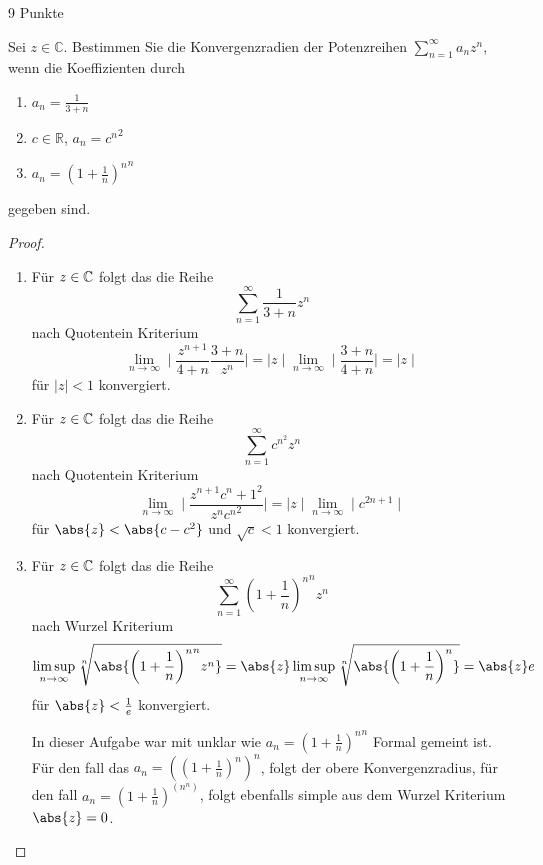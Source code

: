\documentclass{problemset}
\begin{document}
\begin{problem}[Konvergenzradien]{9 Punkte}

Sei $z \in \mathbb{C}$. Bestimmen Sie die Konvergenzradien der Potenzreihen
$\sum\limits_{n=1}^{\infty} a_n z^n$, wenn die Koeffizienten durch
\begin{enumerate}
    \item $a_n = \frac{1}{3 + n}$
    \item $c \in \mathbb{R}$, $a_n = {c^n}^2$
    \item $a_n = {\left(1 + \frac{1}{n}\right)^n}^n$
\end{enumerate}
gegeben sind.

\begin{proof}
    \leavevmode
    \begin{enumerate}
        \item Für \(z \in \mathbb{C}\) folgt das die Reihe
              \[
                  \sum_{n=1}^{\infty} \frac{1}{3 + n} z^n
              \] nach Quotentein Kriterium \[
                  \lim_{n \to \infty} \mid \frac{z^{n+1}}{4+n}\frac{3 + n}{z^n} \mid = \mid z \mid \lim_{n \to \infty} \mid \frac{3+n}{4+n} \mid = \mid z \mid
              \] für \(\mid z \mid < 1\) konvergiert.

        \item Für \(z \in \mathbb{C}\) folgt das die Reihe
              \[
                  \sum_{n=1}^{\infty} c^{n^2} z^n
              \] nach Quotentein Kriterium \[
                  \lim_{n \to \infty} \mid \frac{z^{n+1} {c^n+1}^2}{z^n {c^n}^2} \mid = \mid z \mid \lim_{n \to \infty} \mid c^{2n+1} \mid
              \] für \(\abs{z} < \abs{c-c^2}\) und \(\sqrt{c} < 1\)
                 konvergiert.

        \item Für \(z \in \mathbb{C}\) folgt das die Reihe
              \[
                  \sum_{n=1}^{\infty} {\left(1 + \frac{1}{n}\right)^n}^n z^n
              \] nach Wurzel Kriterium \[
                  \limsup_{n \to \infty} \sqrt[n]{\abs{{{\left(1 + \frac{1}{n}\right)}^n}^n z^n}} = \abs{z} \limsup_{n \to \infty} \sqrt[n]{\abs{{\left(1 + \frac{1}{n}\right)}^n}} = \abs{z} e
              \] für \(\abs{z} < \frac{1}{e}\) konvergiert.

              In dieser Aufgabe war mit unklar wie $a_n = {\left(1 +
              \frac{1}{n}\right)^n}^n$ Formal gemeint ist. Für den fall das
              \(a_n = {({\left(1 + \frac{1}{n}\right)^n})}^n\), folgt der obere
              Konvergenzradius, für den fall \(a_n = {\left(1 +
              \frac{1}{n}\right)}^{(n^n)}\), folgt ebenfalls simple aus dem
              Wurzel Kriterium \(\abs{z} = 0\).
    \end{enumerate}

\end{proof}
\end{problem}
\end{document}
